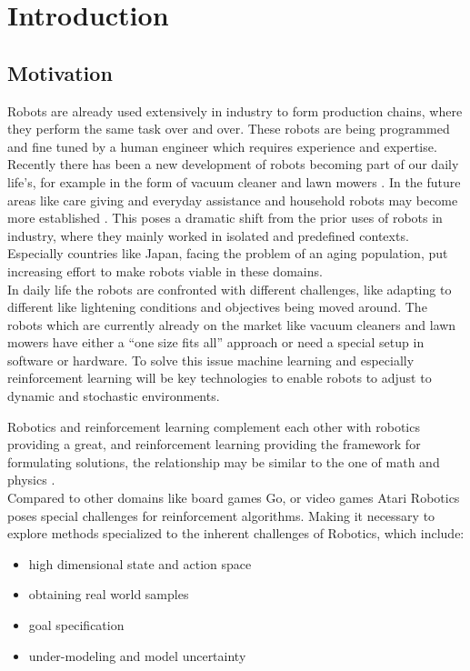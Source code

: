 
\chapter{Introduction}

\section{Motivation}
Robots are already used extensively in industry to form production chains,
where they perform the same task over and over.
These robots are being programmed and fine tuned
by a human engineer which requires experience and expertise. \\
Recently there has been a new development of robots
becoming part of our daily life's, for example in the form of 
vacuum cleaner and lawn mowers . In the future areas like care giving and
everyday assistance and household robots may
become more established \citet{schaal2007new}.
This poses a dramatic shift from the prior uses of robots in industry, where
they mainly worked in isolated and predefined contexts.
Especially countries like Japan, facing the problem of an
aging population, put increasing effort to make robots
viable in these domains.  \\
In daily life the robots are confronted with different challenges,
like  adapting to different like lightening conditions and
objectives being moved around.
The robots which are currently already on the market
like vacuum cleaners and lawn mowers have
either a ``one size fits all'' approach or need a special setup
in software or hardware. To solve this issue
machine learning and especially
reinforcement learning will be key technologies to enable robots
to adjust to dynamic and stochastic environments.

Robotics and reinforcement learning complement each other
with robotics providing a great, and reinforcement learning providing
the framework for formulating solutions, the 
relationship may be similar to the one of  math and physics
\citet{kober2013reinforcement}. \\
Compared to other domains like board games Go, or video games Atari
Robotics  poses special challenges for reinforcement algorithms. Making
it necessary to explore methods specialized to the inherent
challenges of Robotics, which include:

\begin{itemize}
\item high dimensional state and action space
\item obtaining real world samples
\item goal specification
\item under-modeling and model uncertainty
\end{itemize}

